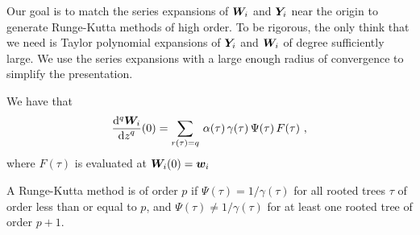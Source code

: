 Our goal is to match the series expansions of $\bm{W}_i$ and
$\bm{Y}_i$ near the origin to generate Runge-Kutta methods of high
order.   To be rigorous, the only think that we need is Taylor
polynomial expansions of $\bm{Y}_i$ and $\bm{W}_i$ of degree
sufficiently large.  We use the series expansions with a large enough
radius of convergence to simplify the presentation.

\begin{prop}
We have that
\[
\displaystyle \frac{\mathrm{d}^{q}{\bm{W}_i}} {\displaystyle \mathrm{d}{z}^{q}}(0) =
\sum_{r(\tau)=q}\,\alpha(\tau)\,\gamma(\tau)\,\Psi(\tau)\,F(\tau)
\ ,
\]
where $F(\tau)$ is evaluated at $\bm{W}_i(0) = \bm{w}_i$
\end{prop}

\begin{theorem}
A Runge-Kutta method is of order $p$ if $\Psi(\tau) = 1/\gamma(\tau)$
for all rooted trees $\tau$ of order less than or equal to $p$, and
$\Psi(\tau) \not= 1/\gamma(\tau)$ for at least one rooted tree of order
$p+1$.
\label{OrdRel}
\end{theorem}

